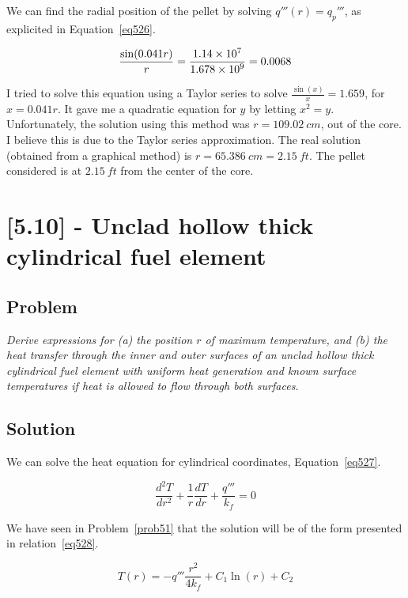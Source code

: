 We can find the radial position of the pellet by solving $q'''(r) = q_p'''$, as explicited in Equation~\ref{eq526}.

\begin{equation}\label{eq526}
\frac{\sin(0.041r)}{r} = \frac{\text{\num{1.14e7}}}{\text{\num{1.678e9}}} = 0.0068
\end{equation}

I tried to solve this equation using a Taylor series to solve $\frac{\sin(x)}{x} = 1.659$, for $x = 0.041r$. It gave me a quadratic equation for $y$ by letting $x^2 = y$. Unfortunately, the solution using this method was $r = 109.02\ cm$, out of the core. I believe this is due to the Taylor series approximation. The real solution (obtained from a graphical method) is $r = 65.386\ cm = 2.15\ ft$. The pellet considered is at $2.15\ ft$ from the center of the core.

\section{[5.10] - Unclad hollow thick cylindrical fuel element}
\label{prob53}

\subsection{Problem}
\textit{Derive expressions for (a) the position $r$ of maximum temperature, and (b) the heat transfer through the inner and outer surfaces of an unclad hollow thick cylindrical fuel element with uniform heat generation and known surface temperatures if heat is allowed to flow through both surfaces.}

\subsection{Solution}

We can solve the heat equation for cylindrical coordinates, Equation~\ref{eq527}.


\begin{equation}\label{eq527}
\frac{d^2T}{dr^2} + \frac{1}{r}\frac{dT}{dr} + \frac{q'''}{k_f} = 0
\end{equation}

We have seen in Problem~\ref{prob51} that the solution will be of the form presented in relation~\ref{eq528}.

\begin{equation}\label{eq528}
T(r) = -q'''\frac{r^2}{4k_f} + C_1\ln(r) + C_2
\end{equation}

